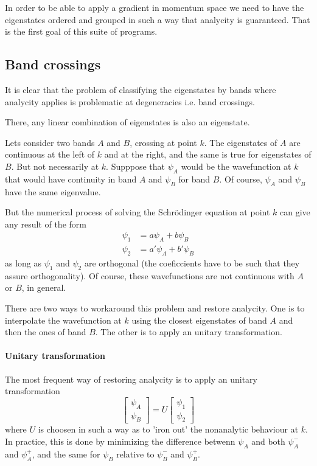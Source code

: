 \documentclass[a4paper,12pt]{report}
\begin{document}
In order to be able to apply a gradient in momentum space we need to have the eigenstates ordered and grouped
in such a way that analycity is guaranteed.
That is the first goal of this suite of programs.



\subsection*{Band crossings}\label{ssec:bandcrossings}

It is clear that the problem of classifying the eigenstates by bands where analycity applies is
 problematic at degeneracies i.e. band crossings.

There, any linear combination of eigenstates is also an eigenstate.

Lets consider two bands $A$ and $B$, crossing at point $k$.
The eigenstates of $A$ are continuous at the left of $k$ and at the right, and the same is true for eigenstates of $B$.
But not necessarily at $k$.
Supppose that $\psi_A$ would be the wavefunction at $k$ that would have continuity in band $A$
and $\psi_B$ for band $B$. Of course, $\psi_A$ and $\psi_B$ have the same eigenvalue.

But the numerical process of solving the Schr\"odinger equation at point $k$ can give any result of the form
\begin{align}
 \psi_1 &= a\psi_A + b\psi_B \\
 \psi_2 &= a'\psi_A + b'\psi_B
\end{align}
as long as $\psi_1$ and $\psi_2$ are orthogonal (the coeficcients have to be such that they assure orthogonality).
Of course, these wavefunctions are not continuous with $A$ or $B$, in general.

There are two ways to workaround this problem and restore analycity.
One is to interpolate the wavefunction at $k$ using the closest eigenstates of band $A$ and then the ones of band $B$.
The other is to apply an unitary transformation.


\paragraph*{Unitary transformation}
The most frequent way of restoring analycity is to apply an unitary transformation
\begin{equation}
 \left[ \begin{matrix}
  \psi_A\\\psi_B
 \end{matrix}\right] = U
 \left[ \begin{matrix}
  \psi_1\\\psi_2
 \end{matrix}\right]
\end{equation}
where $U$ is choosen in such a way as to 'iron out' the nonanalytic behaviour at $k$.
In practice, this is done by minimizing the difference betwenn $\psi_A$ and both $\psi_A^-$ and $\psi_A^+$,
and the same for $\psi_B$ relative to $\psi_B^-$ and $\psi_B^+$.
\end{document}
